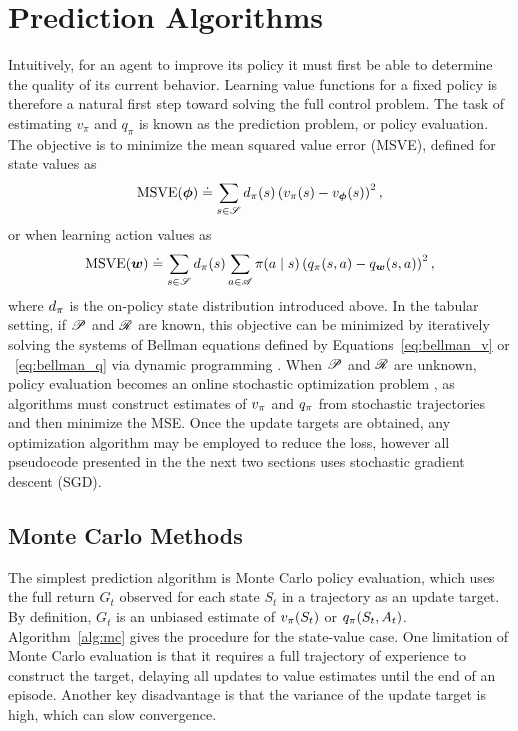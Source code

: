 \section{Prediction Algorithms} \label{sec:prediction}
Intuitively, for an agent to improve its policy it must first be able to determine the quality of its current behavior. Learning value functions for a fixed policy is therefore a natural first step toward solving the full control problem. The task of estimating $v_\pi$ and $q_\pi$ is known as the prediction problem, or policy evaluation. The objective is to minimize the mean squared value error (MSVE), defined for state values as
\begin{equation}
    \text{MSVE}({\bm \phi}) \doteq \sum_{s \in \mathscr{S}} d_{\pi}(s) \left( v_{\pi}(s) - v_{\bm \phi}(s) \right)^2,
    \label{eq:msve_v}
\end{equation}
or when learning action values as
\begin{equation}
    \text{MSVE}({\bm w}) \doteq \sum_{s \in \mathscr{S}} d_{\pi}(s) \sum_{a \in \mathscr{A}} \pi(a \mid s) \left( q_{\pi}(s, a) - q_{\bm w}(s, a) \right)^2,
    \label{eq:msve_q}
\end{equation}
where $d_{\pi}$ is the on-policy state distribution introduced above.
In the tabular setting, if $\mathscr{P}$ and $\mathscr{R}$ are known, this objective can be minimized by iteratively solving the systems of Bellman equations defined by Equations~\eqref{eq:bellman_v} or ~\eqref{eq:bellman_q} via dynamic programming \cite{sutton1998introduction}. When $\mathscr{P}$ and $\mathscr{R}$ are unknown, policy evaluation becomes an online stochastic optimization problem , as algorithms must construct estimates of $v_{\pi}$ and $q_{\pi}$ from stochastic trajectories and then minimize the MSE. Once the update targets are obtained, any optimization algorithm may be employed to reduce the loss, however all pseudocode presented in the the next two sections uses stochastic gradient descent (SGD). 

\subsection{Monte Carlo Methods}
The simplest prediction algorithm is Monte Carlo policy evaluation, which uses the full return $G_t$ observed for each state $S_t$ in a trajectory as an update target. By definition, $G_t$ is an unbiased estimate of $v_{\pi}(S_t)$ or $q_{\pi}(S_t, A_t)$. Algorithm~\ref{alg:mc} gives the procedure for the state-value case. One limitation of Monte Carlo evaluation is that it requires a full trajectory of experience to construct the target, delaying all updates to value estimates until the end of an episode. Another key disadvantage is that the variance of the update target is high, which can slow convergence.

